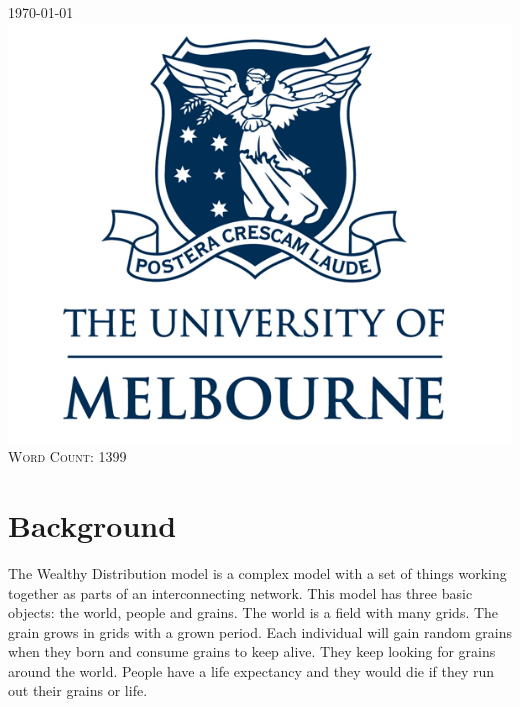 \begin{titlepage}
{\large \today}\\[2cm] %


\includegraphics[scale = 0.27]{logo.png}\\[1cm] %
 \textsc{Word Count: 1399}\\[1.5cm]
\vfill %

\end{titlepage}


\section{Background}
The Wealthy Distribution model is a complex model with a set of things working together as parts of an interconnecting network. This model has three basic objects: the world, people and grains. The world is a field with many grids. The grain grows in grids with a grown period. Each individual will gain random grains when they born and consume grains to keep alive. They keep looking for grains around the world. People have a life expectancy and they would die if they run out their grains or life.\\


